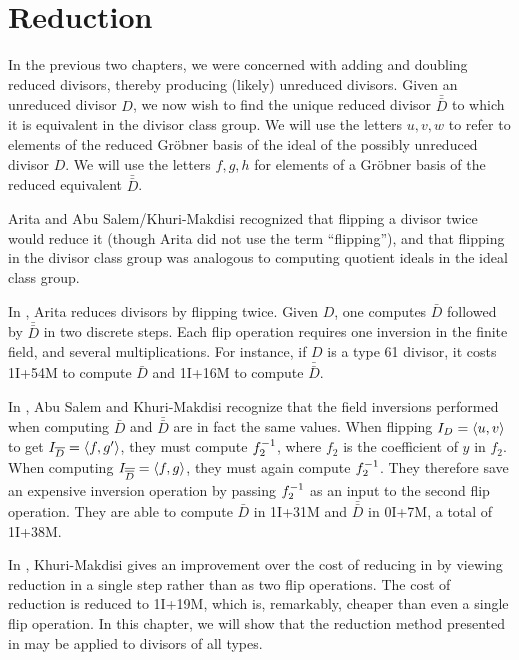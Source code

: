 
\section{Reduction}
\label{chap_reduction}

In the previous two chapters, we were concerned with adding and doubling reduced divisors,
thereby producing (likely) unreduced divisors.
Given an unreduced divisor $D$, we now wish to find the unique reduced divisor $\bar{\bar D}$ to which 
it is equivalent in the divisor class group.
We will use the letters $u,v,w$ to refer to elements of the reduced Gr\"obner basis
of the ideal of the possibly unreduced divisor $D$.
We will use the letters $f,g,h$ for elements of a Gr\"obner basis of the reduced equivalent $\bar{\bar D}$.

Arita and Abu Salem/Khuri-Makdisi recognized that
flipping a divisor twice would reduce it (though Arita did not use the term ``flipping''),
and that flipping in the divisor class group was analogous to computing quotient ideals in the ideal class group.

In \cite{arita05-2}, Arita reduces divisors by flipping twice.
Given $D$, one computes $\bar D$ followed by $\bar{\bar D}$ in two discrete steps.
Each flip operation requires one inversion in the finite field, and several multiplications.
For instance, if $D$ is a type 61 divisor,
it costs 1I+54M to compute $\bar D$ and 1I+16M to compute $\bar{\bar D}$.

In \cite{salem07}, Abu Salem and Khuri-Makdisi recognize that the field inversions performed
when computing $\bar D$ and $\bar{\bar D}$ are in fact the same values.
When flipping $I_D = \left\langle u,v \right\rangle$ to get $I_{\overline D} = \left\langle f,g' \right\rangle$, they must compute $f_2^{-1}$,
where $f_2$ is the coefficient of $y$ in $f_2$.
When computing $I_{\overline{\overline D}} = \left\langle f,g \right\rangle$, they must again compute $f_2^{-1}$.
They therefore save an expensive inversion operation by passing $f_2^{-1}$ as an input to the second flip operation.
They are able to compute $\bar D$ in 1I+31M and $\bar{\bar D}$ in 0I+7M, a total of 1I+38M.

In \cite{kmakdisi18}, Khuri-Makdisi gives an improvement over the cost of reducing in \cite{salem07}
by viewing reduction in a single step rather than as two flip operations.
The cost of reduction is reduced to 1I+19M, which is, remarkably, cheaper than even a single flip operation.
In this chapter, we will show that the reduction method presented in \cite{kmakdisi18}
may be applied to divisors of all types.

